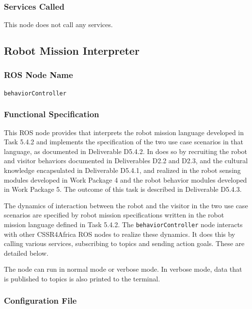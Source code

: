 \documentclass{CSSRforAfrica}
\begin{document}
\subsubsection*{Services Called}
This node does not call any services.



\newpage

\subsection{Robot Mission Interpreter}
\label{section:behavior_controller}

\subsubsection*{ROS Node Name}
 {\small \verb+behaviorController+}   

\subsubsection*{Functional Specification}
This ROS node  provides that interprets the robot mission language developed in Task 5.4.2 and implements the specification of the two  use case scenarios in that language, as documented in Deliverable D5.4.2. In does so by  recruiting the robot and visitor behaviors documented in Deliverables D2.2 and D2.3, and the cultural knowledge encapsulated in Deliverable D5.4.1, and realized in the robot sensing modules developed in Work Package 4 and the robot behavior modules developed in Work Package 5.  The outcome of this task  is described in Deliverable D5.4.3. 

The dynamics of interaction between the robot and the visitor in the two use case scenarios are specified by robot mission specifications  written in the robot mission language defined in Task 5.4.2.  The  {\small \verb+behaviorController+}  node interacts with other CSSR4Africa ROS nodes to realize these dynamics.  It does this by calling various services, subscribing to topics and sending action goals. These are detailed below.

The node can run in normal mode or verbose mode. In verbose mode, data that is published to topics is also printed to the terminal.

\subsubsection*{Configuration File}
\end{document}
